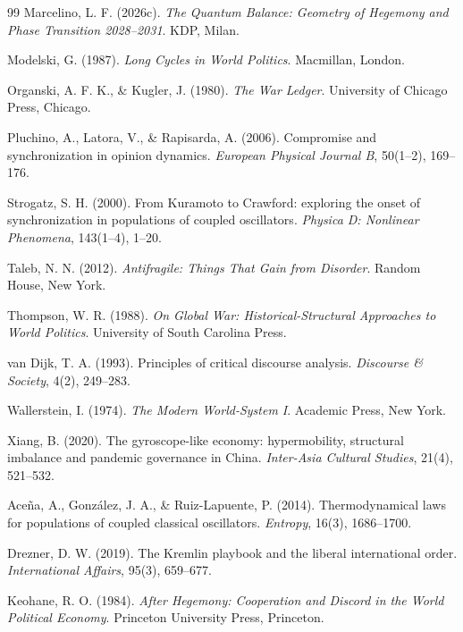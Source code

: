 \documentclass[12pt]{article}
\theoremstyle{plain}
\theoremstyle{definition}
\theoremstyle{remark}
\begin{document}
\begin{thebibliography}{99}
Marcelino, L. F. (2026c). \textit{The Quantum Balance: Geometry of Hegemony and Phase Transition 2028--2031}. KDP, Milan.

Modelski, G. (1987). \textit{Long Cycles in World Politics}. Macmillan, London.

Organski, A. F. K., \& Kugler, J. (1980). \textit{The War Ledger}. University of Chicago Press, Chicago.

Pluchino, A., Latora, V., \& Rapisarda, A. (2006). Compromise and synchronization in opinion dynamics. \textit{European Physical Journal B}, 50(1--2), 169--176.

Strogatz, S. H. (2000). From Kuramoto to Crawford: exploring the onset of synchronization in populations of coupled oscillators. \textit{Physica D: Nonlinear Phenomena}, 143(1--4), 1--20.

Taleb, N. N. (2012). \textit{Antifragile: Things That Gain from Disorder}. Random House, New York.

Thompson, W. R. (1988). \textit{On Global War: Historical-Structural Approaches to World Politics}. University of South Carolina Press.

van Dijk, T. A. (1993). Principles of critical discourse analysis. \textit{Discourse \& Society}, 4(2), 249--283.

Wallerstein, I. (1974). \textit{The Modern World-System I}. Academic Press, New York.

Xiang, B. (2020). The gyroscope-like economy: hypermobility, structural imbalance and pandemic governance in China. \textit{Inter-Asia Cultural Studies}, 21(4), 521--532.

Aceña, A., González, J. A., \& Ruiz-Lapuente, P. (2014). Thermodynamical laws for populations of coupled classical oscillators. \textit{Entropy}, 16(3), 1686--1700.

Drezner, D. W. (2019). The Kremlin playbook and the liberal international order. \textit{International Affairs}, 95(3), 659--677.

Keohane, R. O. (1984). \textit{After Hegemony: Cooperation and Discord in the World Political Economy}. Princeton University Press, Princeton.


\end{thebibliography}
\end{document}
